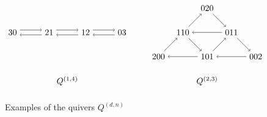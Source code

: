 \documentclass[ALCO,Unicode,published]{cedram}
\begin{document}
\begin{figure}
\caption{Examples of the quivers $Q^{(d, n)}$}\label{fig:qdn_ex}
\[
\begin{tikzpicture}


\begin{scope}[shift={(-3,1)},xscale=1.5]

\node(30) at (0,0) {30};
\node(21) at (1,0) {21};
\node(12) at (2,0) {12};
\node(03) at (3,0) {03};

\draw[transform canvas={yshift=1mm},->] (30) -- (21);
\draw[transform canvas={yshift=-1mm},->] (21) -- (30);

\draw[transform canvas={yshift=1mm},->] (21) -- (12);
\draw[transform canvas={yshift=-1mm},->] (12) -- (21);

\draw[transform canvas={yshift=1mm},->] (12) -- (03);
\draw[transform canvas={yshift=-1mm},->] (03) -- (12);

\node at (1.5,-2) {$Q^{(1,4)}$};

\end{scope}


\begin{scope}[shift={(3,0)}]

\node(200) at (0,0) {200};
\node(110) at (1,1) {110};
\node(020) at (2,2) {020};
\node(011) at (3,1) {011};
\node(002) at (4,0) {002};
\node(101) at (2,0) {101};

\draw[->] (200) -- (110);
\draw[->] (110) -- (020);
\draw[->] (020) -- (011);
\draw[->] (011) -- (002);
\draw[->] (002) -- (101);
\draw[->] (101) -- (200);
\draw[->] (110) -- (101);
\draw[->] (101) -- (011);
\draw[->] (011) -- (110);

\node at (2,-1) {$Q^{(2,3)}$};

\end{scope}

\end{tikzpicture}
\]
\end{figure}
\end{document}
